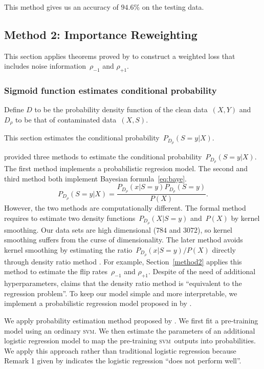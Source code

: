 \documentclass[12pt]{article} %
\newcommand{\svm}{\textsc{svm}}
\newcommand{\rhoo}{\rho_{+1}}
\newcommand{\rhoz}{\rho_{-1}}
\begin{document}
This method gives us an accuracy of $94.6\%$ on the testing data.


\subsection{Method 2: Importance Reweighting} \label{3rd}
This section applies theorems proved by \citet{liu2016classification} to construct a weighted loss that includes noise information~$\rhoz$ and $\rhoo$. 

\subsubsection{Sigmoid function estimates conditional probability}\label{sigmoid}
Define $D$ to be the probability density function of the clean data~$(X,Y)$ and $D_\rho$ to be that of contaminated data~$(X,S)$.

This section estimates the conditional probability~$P_{D_\rho}(S=y|X)$.

\citet{liu2016classification} provided three methods to estimate the conditional probability~$P_{D_\rho}(S=y|X)$. 
The first method implements a probabilistic regresion model. 
The second and third method both implement Bayesian formula~\eqref{eq:baye}.
\begin{equation*}
   P_{D_\rho}(S=y|X)=\frac{P_{D_\rho}(x|S=y)P_{D_\rho}(S=y)}{P(X)}.
\end{equation*}
However, the two methods are computationally different. The formal method requires to estimate two density functions~$P_{D_\rho}(X|S=y)$ and~$P(X)$ by kernel smoothing. Our data sets are high dimensional ($784$ and $3072$), so kernel smoothing suffers from the curse of dimensionality. The later method avoids kernel smoothing by estimating the ratio~$P_{D_\rho}(x|S=y)/P(X)$ directly through density ratio method \citep{liu2016classification}. For example, Section~\ref{method2} applies this method to estimate the flip rates~$\rhoz$ and $\rhoo$. Despite of the need of additional hyperparameters,  \citet{Sugiyama10densityratio} claims that the density ratio method is ``equivalent to the regression problem''. To keep our model simple and more interpretable, we implement a probabilistic regression model proposed in by \citet[Section~5.1]{liu2016classification}. 

We apply probability estimation method proposed by \citet{Platt99probabilisticoutputs}. We first fit a pre-training model using an ordinary \svm . We then estimate the parameters of an additional logistic regression model to map the pre-training \svm\ outputs into probabilities. We apply this approach rather than traditional logistic regression because Remark 1 given by \citet{liu2016classification} indicates the logistic regression ``does not perform well''.
\end{document}
